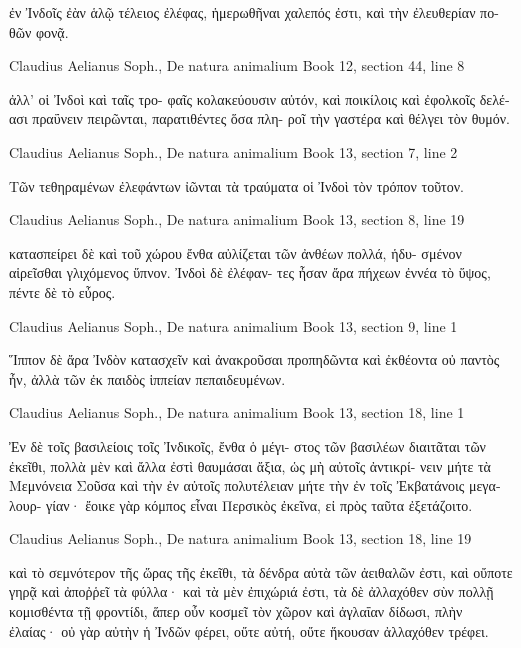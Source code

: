 \documentclass[12pt,letterpaper,twoside,final]{memoir}
\begin{document}
\begin{greek}
                  ἐν Ἰνδοῖς ἐὰν ἁλῷ τέλειος ἐλέφας, 
ἡμερωθῆναι χαλεπός ἐστι, καὶ τὴν ἐλευθερίαν πο-
θῶν φονᾷ. 



Claudius Aelianus Soph., De natura animalium 
Book 12, section 44, line 8

                           ἀλλ' οἱ Ἰνδοὶ καὶ ταῖς τρο-
φαῖς κολακεύουσιν αὐτόν, καὶ ποικίλοις καὶ ἐφολκοῖς 
δελέασι πραΰνειν πειρῶνται, παρατιθέντες ὅσα πλη-
ροῖ τὴν γαστέρα καὶ θέλγει τὸν θυμόν. 



Claudius Aelianus Soph., De natura animalium 
Book 13, section 7, line 2

Τῶν τεθηραμένων ἐλεφάντων ἰῶνται τὰ τραύματα 
οἱ Ἰνδοὶ τὸν τρόπον τοῦτον. 



Claudius Aelianus Soph., De natura animalium 
Book 13, section 8, line 19

                                    κατασπείρει δὲ καὶ 
τοῦ χώρου ἔνθα αὐλίζεται τῶν ἀνθέων πολλά, ἡδυ-
σμένον αἱρεῖσθαι γλιχόμενος ὕπνον. Ἰνδοὶ δὲ ἐλέφαν-
τες ἦσαν ἄρα πήχεων ἐννέα τὸ ὕψος, πέντε δὲ τὸ 
εὖρος. 



Claudius Aelianus Soph., De natura animalium 
Book 13, section 9, line 1

Ἵππον δὲ ἄρα Ἰνδὸν κατασχεῖν καὶ ἀνακροῦσαι   
προπηδῶντα καὶ ἐκθέοντα οὐ παντὸς ἦν, ἀλλὰ τῶν 
ἐκ παιδὸς ἱππείαν πεπαιδευμένων. 



Claudius Aelianus Soph., De natura animalium 
Book 13, section 18, line 1

Ἐν δὲ τοῖς βασιλείοις τοῖς Ἰνδικοῖς, ἔνθα ὁ μέγι-
στος τῶν βασιλέων διαιτᾶται τῶν ἐκεῖθι, πολλὰ μὲν 
καὶ ἄλλα ἐστὶ θαυμάσαι ἄξια, ὡς μὴ αὐτοῖς ἀντικρί-
νειν μήτε τὰ Μεμνόνεια Σοῦσα καὶ τὴν ἐν αὐτοῖς 
πολυτέλειαν μήτε τὴν ἐν τοῖς Ἐκβατάνοις μεγαλουρ-
γίαν· ἔοικε γὰρ κόμπος εἶναι Περσικὸς ἐκεῖνα, εἰ 
πρὸς ταῦτα ἐξετάζοιτο. 



Claudius Aelianus Soph., De natura animalium 
Book 13, section 18, line 19

                              καὶ τὸ σεμνότερον τῆς   
ὥρας τῆς ἐκεῖθι, τὰ δένδρα αὐτὰ τῶν ἀειθαλῶν ἐστι, 
καὶ οὔποτε γηρᾷ καὶ ἀποῤῥεῖ τὰ φύλλα· καὶ τὰ μὲν 
ἐπιχώριά ἐστι, τὰ δὲ ἀλλαχόθεν σὺν πολλῇ κομισθέντα 
τῇ φροντίδι, ἅπερ οὖν κοσμεῖ τὸν χῶρον καὶ ἀγλαΐαν 
δίδωσι, πλὴν ἐλαίας· οὐ γὰρ αὐτὴν ἡ Ἰνδῶν φέρει, 
οὔτε αὐτή, οὔτε ἥκουσαν ἀλλαχόθεν τρέφει. 




\end{greek}
\end{document}
